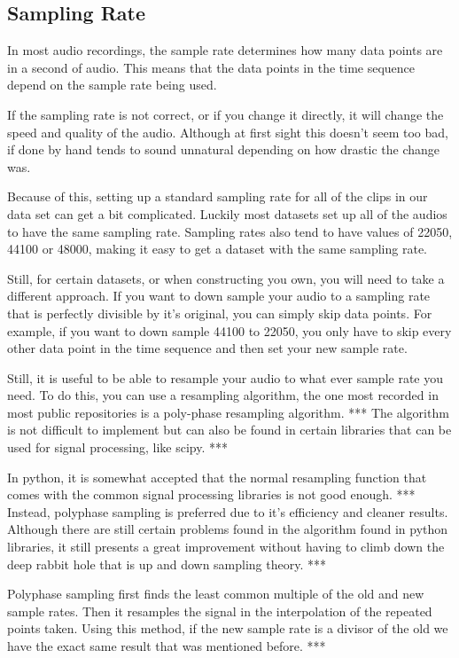 \documentclass{book}
\begin{document}
\subsection{Sampling Rate}
\qquad In most audio recordings, the sample rate determines how many data points are in a second of audio.
This means that the data points in the time sequence depend on the sample rate being used.
\par
If the sampling rate is not correct, or if you change it directly, it will change the speed and quality of the audio.
Although at first sight this doesn't seem too bad, if done by hand tends to sound unnatural depending on how drastic the change was.
\par
Because of this, setting up a standard sampling rate for all of the clips in our data set can get a bit complicated.
Luckily most datasets set up all of the audios to have the same sampling rate.
Sampling rates also tend to have values of 22050, 44100 or 48000, making it easy to get a dataset with the same sampling rate.
\par
Still, for certain datasets, or when constructing you own, you will need to take a different approach.
If you want to down sample your audio to a sampling rate that is perfectly divisible by it's original, you can simply skip data points.
For example, if you want to down sample 44100 to 22050, you only have to skip every other data point in the time sequence and then set your new sample rate.
\par
Still, it is useful to be able to resample your audio to what ever sample rate you need.
To do this, you can use a resampling algorithm, the one most recorded in most public repositories is a poly-phase resampling algorithm. *** %
The algorithm is not difficult to implement but can also be found in certain libraries that can be used for signal processing, like scipy. *** %
\par
In python, it is somewhat accepted that the normal resampling function that comes with the common signal processing libraries is not good enough. *** %
Instead, polyphase sampling is preferred due to it's efficiency and cleaner results.
Although there are still certain problems found in the algorithm found in python libraries, it still presents a great improvement without having to climb down the deep rabbit hole that is up and down sampling theory. *** %
\par
Polyphase sampling first finds the least common multiple of the old and new sample rates.
Then it resamples the signal in the interpolation of the repeated points taken.
Using this method, if the new sample rate is a divisor of the old we have the exact same result that was mentioned before. *** %
\end{document}
